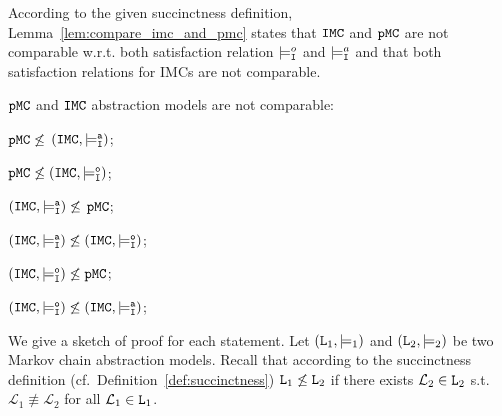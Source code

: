 \documentclass{llncs}
\newcommand{\imc}{\textnormal{IMC}}
\newcommand{\pmcSet}{\ensuremath{\tt{pMC}}}
\newcommand{\imcSet}{\ensuremath{\tt{IMC}}}
\newcommand{\aminstance}{\ensuremath{{\tt L}}}
\newcommand{\satisfactionImcOnce}{\ensuremath{\models^{o}_{\tt{I}}}}
\newcommand{\satisfactionImc}{\ensuremath{\models^{a}_{\tt{I}}}}
\newcommand{\cf} {cf.\ }
\begin{document}
    According to the given succinctness definition, 
 Lemma~\ref{lem:compare_imc_and_pmc} states that
 {\imcSet} and {\pmcSet} are not comparable w.r.t. both satisfaction relation $\satisfactionImcOnce$ and $\satisfactionImc$
 and that both satisfaction relations for {\imc}s are not comparable.

\begin{lemma}\label{lem:compare_imc_and_pmc}
	$\pmcSet$ and $\imcSet$ abstraction models are not comparable:
    \begin{enumerate*}
    	\item $\pmcSet \not\leq$ $(\imcSet, \satisfactionImc)$;
        \item $\pmcSet \not\leq (\imcSet, \satisfactionImcOnce)$;
        \item $(\imcSet, \satisfactionImc) \not\leq$ $\pmcSet$;
    	\item $(\imcSet, \satisfactionImc) \not\leq (\imcSet, \satisfactionImcOnce)$;
		\item $(\imcSet, \satisfactionImcOnce) \not\leq \pmcSet$;
    	\item $(\imcSet, \satisfactionImcOnce) \not\leq (\imcSet, \satisfactionImc)$;
	\end{enumerate*}
\end{lemma}

	We give a sketch of proof for each statement.
    Let $(\aminstance_1, \models_1)$ and $(\aminstance_2, \models_2)$ be two Markov chain abstraction models.
    Recall that according to the succinctness definition (\cf Definition~\ref{def:succinctness})
	$\aminstance_1 \not\leq \aminstance_2$
    if there exists
    $\mathcal{L}_2 \in \aminstance_2$ s.t.
    $\mathcal{L}_1 \not\equiv \mathcal{L}_2$
    for all $\mathcal{L}_1 \in \aminstance_1$.
    
\end{document}
